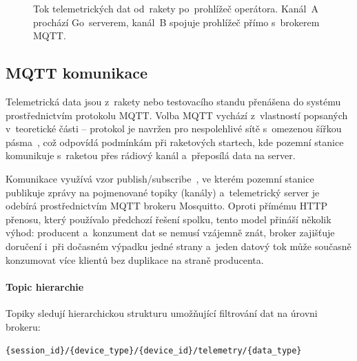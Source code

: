 \begin{figure}[H]
\caption{Tok telemetrických dat od~rakety po~prohlížeč operátora. Kanál~A prochází Go~serverem, kanál~B spojuje prohlížeč přímo s~brokerem MQTT.}
\label{fig:telemetry-flow}
\end{figure}

\subsection{MQTT komunikace}

Telemetrická data jsou z~rakety nebo testovacího standu přenášena do systému prostřednictvím protokolu MQTT. Volba MQTT vychází z~vlastností popsaných v~teoretické části -- protokol je navržen pro nespolehlivé sítě s~omezenou šířkou pásma~\cite{mqtt2014oasis}, což odpovídá podmínkám při raketových startech, kde pozemní stanice komunikuje s~raketou přes rádiový kanál a~přeposílá data na server.

Komunikace využívá vzor publish/subscribe~\cite{quincozes2019mqtt}, ve kterém pozemní stanice publikuje zprávy na pojmenované topiky (kanály) a~telemetrický server je odebírá prostřednictvím MQTT brokeru Mosquitto. Oproti přímému HTTP přenosu, který používalo předchozí řešení spolku, tento model přináší několik výhod: producent a~konzument dat se nemusí vzájemně znát, broker zajišťuje doručení i~při dočasném výpadku jedné strany a~jeden datový tok může současně konzumovat více klientů bez duplikace na straně producenta.

\paragraph{Topic hierarchie}

Topiky sledují hierarchickou strukturu umožňující filtrování dat na úrovni brokeru:

\begin{center}
\small\texttt{\{session\_id\}/\{device\_type\}/\{device\_id\}/telemetry/\{data\_type\}}
\end{center}

